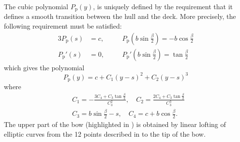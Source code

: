 The cubic polynomial $P_{\mathrm{p}}(y)$, is uniquely defined by the requirement that it defines a smooth transition between the hull and the deck. More precisely, the following requirement must be satisfied: 
\begin{alignat*}{3}
	P_{\mathrm{p}}(s) &= c,\quad  &&P_{\mathrm{p}}\left(b\sin\frac{\beta}{2}\right) = -b\cos\frac{\beta}{2}\\
	P_{\mathrm{p}}'(s) &= 0,\quad &&P_{\mathrm{p}}'\left(b\sin\frac{\beta}{2}\right) = \tan\frac{\beta}{2}
\end{alignat*}
which gives the polynomial
\begin{equation*}
	P_{\mathrm{p}}(y) = c+C_1(y-s)^2+C_2(y-s)^3
\end{equation*}
where
\begin{equation*}
\begin{aligned}
	&C_1 = -\frac{3C_4+C_3\tan\frac{\beta}{2}}{C_3^2}, \quad
	C_2 = \frac{2C_4+C_3\tan\frac{\beta}{2}}{C_3^3}\\
	&C_3 = b\sin\frac{\beta}{2}-s, \quad
	C_4 = c+b\cos\frac{\beta}{2}.
\end{aligned}
\end{equation*}
The upper part of the bow (highlighted in ) is obtained by linear lofting of elliptic curves from the 12 points described in  to the tip of the bow. 

